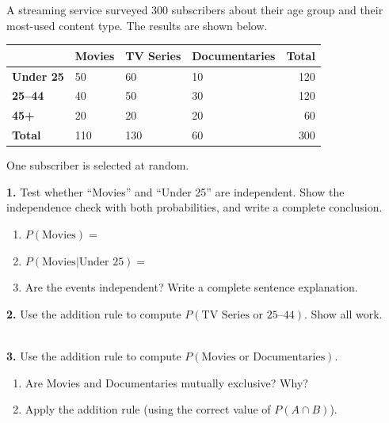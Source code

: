 \documentclass[10pt]{article}
\begin{document}
\namedateperiod

\vspace{0.1in}

\begin{practicebox}
\small
A streaming service surveyed 300 subscribers about their age group and their
most-used content type. The results are shown below.

\vspace{6pt}
\renewcommand{\arraystretch}{1.4}
\begin{tabularx}{\linewidth}{@{} l X X X r @{}}
 & \textbf{Movies} & \textbf{TV Series} & \textbf{Documentaries} & \textbf{Total} \\
\hline
\textbf{Under 25}  & 50 & 60 & 10 & 120 \\
\textbf{25--44}    & 40 & 50 & 30 & 120 \\
\textbf{45+}       & 20 & 20 & 20 & 60  \\
\hline
\textbf{Total}     & 110 & 130 & 60 & 300 \\
\end{tabularx}

\vspace{8pt}
One subscriber is selected at random.

\vspace{8pt}
\textbf{1.} Test whether ``Movies'' and ``Under 25'' are independent. Show the
independence check with both probabilities, and write a complete conclusion.
\begin{enumerate}[label=(\alph*), leftmargin=2em, itemsep=6pt]
  \item $P(\text{Movies}) = $ \blank{5cm}
  \item $P(\text{Movies} | \text{Under 25}) = $ \blank{5cm}
  \item Are the events independent? Write a complete sentence explanation.\\
        \writeline\writeline
\end{enumerate}

\vspace{8pt}
\textbf{2.} Use the addition rule to compute $P(\text{TV Series or 25--44})$.
Show all work.\\
\writeline\\[1pt]\writeline

\vspace{8pt}
\textbf{3.} Use the addition rule to compute $P(\text{Movies or Documentaries})$.
\begin{enumerate}[label=(\alph*), leftmargin=2em, itemsep=6pt]
  \item Are Movies and Documentaries mutually exclusive? \blank{3cm} Why? \writeline
  \item Apply the addition rule (using the correct value of $P(A \cap B)$).\\
        \writeline\writeline
\end{enumerate}


\end{practicebox}
\end{document}
